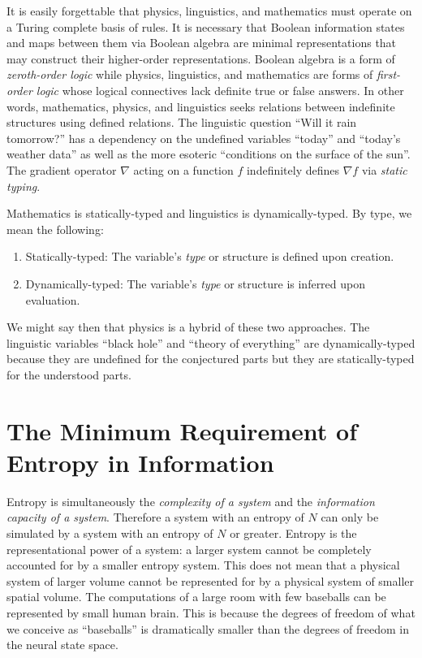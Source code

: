 \documentclass[10pt, a5paper, twoside, openright]{memoir}
\begin{document}
It is easily forgettable that physics, linguistics, and mathematics must operate on a Turing complete basis of rules. It is necessary that Boolean information states and maps between them via Boolean algebra are minimal representations that may construct their higher-order representations. Boolean algebra is a form of \textit{zeroth-order logic} while physics, linguistics, and mathematics are forms of \textit{first-order logic} whose logical connectives lack definite true or false answers. In other words, mathematics, physics, and linguistics seeks relations between indefinite structures using defined relations. The linguistic question ``Will it rain tomorrow?'' has a dependency on the undefined variables ``today'' and ``today's weather data'' as well as the more esoteric ``conditions on the surface of the sun''. The gradient operator $\nabla$ acting on a function $f$ indefinitely defines $\nabla f$ via \textit{static typing}.

Mathematics is statically-typed and linguistics is dynamically-typed. By type, we mean the following:
\begin{enumerate}
\item Statically-typed: The variable's \textit{type} or structure is defined upon creation.
\item Dynamically-typed: The variable's \textit{type} or structure is inferred upon evaluation.
\end{enumerate}
We might say then that physics is a hybrid of these two approaches. The linguistic variables ``black hole'' and ``theory of everything'' are dynamically-typed because they are undefined for the conjectured parts but they are statically-typed for the understood parts.

\section{The Minimum Requirement of Entropy in Information}

Entropy is simultaneously the \textit{complexity of a system} and the \textit{information capacity of a system}. Therefore a system with an entropy of $N$ can only be simulated by a system with an entropy of $N$ or greater. Entropy is the representational power of a system: a larger system cannot be completely accounted for by a smaller entropy system. This does not mean that a physical system of larger volume cannot be represented for by a physical system of smaller spatial volume. The computations of a large room with few baseballs can be represented by small human brain. This is because the degrees of freedom of what we conceive as ``baseballs'' is dramatically smaller than the degrees of freedom in the neural state space.
\end{document}
